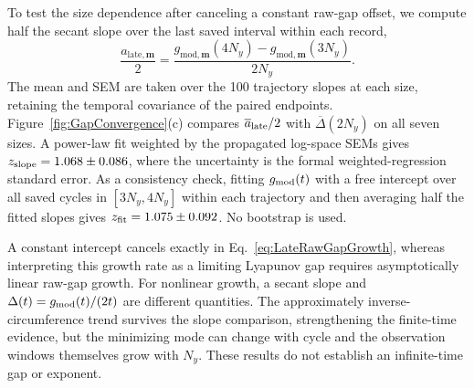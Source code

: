 \documentclass[aps,prb,10pt,twocolumn,superscriptaddress,longbibliography,floatfix]{revtex4-2}
\newcommand{\rec}{\mathbf m}   %
\newcommand{\newtext}[1]{{\color{blue}#1}}
\begin{document}
{\newtext{To test the size dependence after canceling a constant raw-gap offset, we compute half the secant slope over the last saved interval within each record,
\begin{equation}
 \frac{a_{\mathrm{late},\rec}}{2}
 =\frac{g_{\mathrm{mod},\rec}(4N_y)-g_{\mathrm{mod},\rec}(3N_y)}{2N_y}.
 \label{eq:LateRawGapGrowth}
\end{equation}
The mean and SEM are taken over the 100 trajectory slopes at each size, retaining the temporal covariance of the paired endpoints. Figure~\ref{fig:GapConvergence}(c) compares $\overline a_{\rm late}/2$ with $\overline\Delta(2N_y)$ on all seven sizes. A power-law fit weighted by the propagated log-space SEMs gives $z_{\rm slope}=1.068\pm0.086$, where the uncertainty is the formal weighted-regression standard error. As a consistency check, fitting $g_{\rm mod}(t)$ with a free intercept over all saved cycles in $[3N_y,4N_y]$ within each trajectory and then averaging half the fitted slopes gives $z_{\rm fit}=1.075\pm0.092$. No bootstrap is used.}

\newtext{A constant intercept cancels exactly in Eq.~\eqref{eq:LateRawGapGrowth}, whereas interpreting this growth rate as a limiting Lyapunov gap requires asymptotically linear raw-gap growth. For nonlinear growth, a secant slope and $\Delta(t)=g_{\rm mod}(t)/(2t)$ are different quantities. The approximately inverse-circumference trend survives the slope comparison, strengthening the finite-time evidence, but the minimizing mode can change with cycle and the observation windows themselves grow with $N_y$. These results do not establish an infinite-time gap or exponent.}
}
\end{document}
